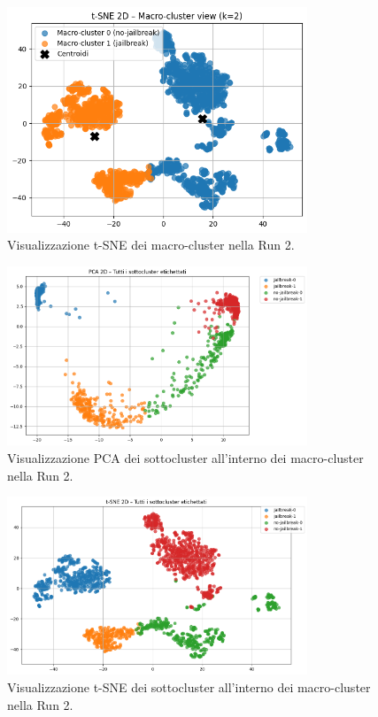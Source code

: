\documentclass[a4paper,12pt]{article}
\begin{document}
\begin{figure}[h]
    \centering
    \includegraphics[width=0.8\textwidth]{run2-tsne-tot.png}
    \caption{Visualizzazione t-SNE dei macro-cluster nella Run 2.}
    \label{fig:run2_tsne_tot}
\end{figure}

\begin{figure}[h]
    \centering
    \includegraphics[width=0.8\textwidth]{run2-pca-div.png}
    \caption{Visualizzazione PCA dei sottocluster all'interno dei macro-cluster nella Run 2.}
    \label{fig:run2_pca_div}
\end{figure}

\begin{figure}[h]
    \centering
    \includegraphics[width=0.8\textwidth]{run2-tsne-div.png}
    \caption{Visualizzazione t-SNE dei sottocluster all'interno dei macro-cluster nella Run 2.}
    \label{fig:run2_tsne_div}
\end{figure}
\end{document}
